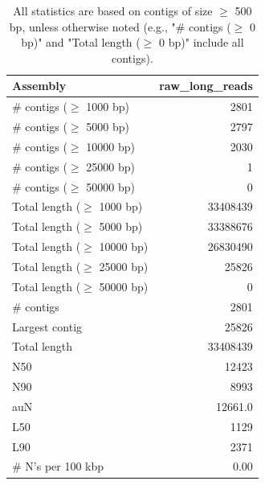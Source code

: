 \documentclass[12pt,a4paper]{article}
\begin{document}
\begin{table}[ht]
\begin{center}
\caption{All statistics are based on contigs of size $\geq$ 500 bp, unless otherwise noted (e.g., "\# contigs ($\geq$ 0 bp)" and "Total length ($\geq$ 0 bp)" include all contigs).}
\begin{tabular}{|l*{1}{|r}|}
\hline
Assembly & raw\_long\_reads \\ \hline
\# contigs ($\geq$ 1000 bp) & 2801 \\ \hline
\# contigs ($\geq$ 5000 bp) & 2797 \\ \hline
\# contigs ($\geq$ 10000 bp) & 2030 \\ \hline
\# contigs ($\geq$ 25000 bp) & 1 \\ \hline
\# contigs ($\geq$ 50000 bp) & 0 \\ \hline
Total length ($\geq$ 1000 bp) & 33408439 \\ \hline
Total length ($\geq$ 5000 bp) & 33388676 \\ \hline
Total length ($\geq$ 10000 bp) & 26830490 \\ \hline
Total length ($\geq$ 25000 bp) & 25826 \\ \hline
Total length ($\geq$ 50000 bp) & 0 \\ \hline
\# contigs & 2801 \\ \hline
Largest contig & 25826 \\ \hline
Total length & 33408439 \\ \hline
N50 & 12423 \\ \hline
N90 & 8993 \\ \hline
auN & 12661.0 \\ \hline
L50 & 1129 \\ \hline
L90 & 2371 \\ \hline
\# N's per 100 kbp & 0.00 \\ \hline
\end{tabular}
\end{center}
\end{table}
\end{document}
